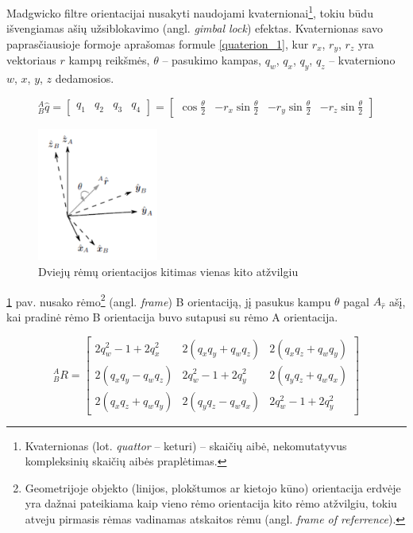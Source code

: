 \documentclass[]{vgtuef}
\begin{document}
Madgwicko filtre orientacijai nusakyti naudojami kvaternionai\footnote{Kvaternionas (lot. \textit{quattor} – keturi) – skaičių aibė, nekomutatyvus kompleksinių skaičių aibės praplėtimas. }, tokiu būdu išvengiamas ašių užsiblokavimo (angl. \textit{gimbal lock}) efektas. Kvaternionas savo paprasčiausioje formoje aprašomas formule \ref{quaterion_1}, kur $r_{x}$, $r_{y}$, $r_{z}$ yra vektoriaus $r$ kampų reikšmės, $\theta$ – pasukimo kampas, $q_{w}$, $q_{x}$, $q_{y}$, $q_{z}$ – kvaterniono $w$, $x$, $y$, $z$ dedamosios. 

\begin{equation}
_{B}^{A}\hat{q}= \begin{bmatrix} q_{1} & q_{2} & q_{3} & q_{4}
\end{bmatrix} = \begin{bmatrix}
\cos\frac{\theta}{2} & -r_{x}\sin\frac{\theta}{2} & -r_{y}\sin\frac{\theta}{2} & -r_{z}\sin\frac{\theta}{2}
\end{bmatrix}
\label{quaterion_1}
\end{equation}

\begin{figure}[!h]
  \centering
  \includegraphics[width=150px]{img/quaternion_frame.png}
  \caption{Dviejų rėmų orientacijos kitimas vienas kito atžvilgiu}
  \label{fig:quaternion_2}
\end{figure}

\ref{fig:quaternion_2} pav. nusako rėmo\footnote{Geometrijoje objekto (linijos, plokštumos ar kietojo kūno) orientacija erdvėje yra dažnai pateikiama kaip vieno rėmo orientacija kito rėmo atžvilgiu, tokiu atveju pirmasis rėmas vadinamas atskaitos rėmu (angl. \textit{frame of referrence}).} (angl. \textit{frame}) B orientaciją, jį pasukus kampu $\theta$ pagal $A_{\hat{r}}$  ašį, kai pradinė rėmo B orientacija buvo sutapusi su rėmo A orientacija.

\begin{equation}
_{B}^{A}R = \begin{bmatrix} 
   2q_{w}^{2} - 1 + 2q_{x}^{2} & 2(q_{x}q_{y}+q_{w}q_{z}) & 2(q_{x}q_{z}+q_{w}q_{y})
\\ 2(q_{x}q_{y}-q_{w}q_{z}) & 2q_{w}^{2} - 1 + 2q_{y}^{2} & 2(q_{y}q_{z}+q_{w}q_{x})
\\ 2(q_{x}q_{z}+q_{w}q_{y}) & 2(q_{y}q_{z}-q_{w}q_{x}) & 2q_{w}^{2} - 1 + 2q_{y}^{2}
\end{bmatrix}
\label{equ:rotation_matrix}
\end{equation}
\end{document}
